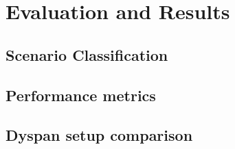 \acresetall
\chapter{Evaluation and Results}\label{chapter:evaluation}

\section{Scenario Classification}
\section{Performance metrics}
\section{Dyspan setup comparison}
